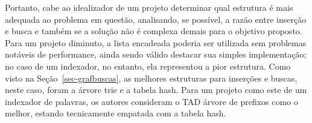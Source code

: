 \enlargethispage{\baselineskip}
\enlargethispage{\baselineskip}
Portanto, cabe ao idealizador de um projeto determinar qual estrutura é mais adequada ao problema em questão, analisando, se possível, a razão entre inserção e busca e também se a solução não é complexa demais para o objetivo proposto. Para um projeto diminuto, a lista encadeada poderia ser utilizada sem problemas notáveis de performance, ainda sendo válido destacar sua simples implementação; no caso de um indexador, no entanto, ela representou a pior estrutura. Como visto na Seção~\ref{sec-grafbuscas}, as melhores estruturas para inserções e buscas, neste caso, foram a árvore trie e a tabela hash. Para um projeto como este de um indexador de palavras, os autores consideram o TAD árvore de prefixos como o melhor, estando tecnicamente empatada com a tabela hash.